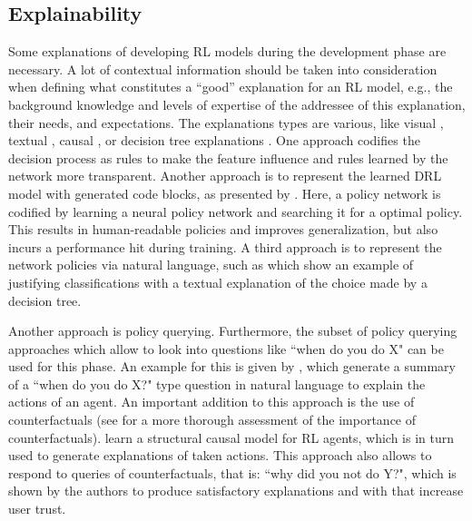 \documentclass[twoside,11pt]{article}
\begin{document}
\subsection{Explainability}
Some explanations of developing RL models during the development phase are necessary. A lot of contextual information should be taken into consideration when defining what constitutes a ``good” explanation for an RL model, e.g., the background knowledge and levels of expertise of the addressee of this explanation, their needs, and expectations. The explanations types are various, like visual \citep{DBLP:journals/corr/abs-1912-12191,DBLP:journals/corr/abs-1912-05743}, textual \citep{HayesShah:2017:AutonomousPolicyExplanation,fukuchi2017autonomous}, causal \citep{MadumalEtAl:2020:CausalRLCFs,Madumal:2020:DistalEF}, or decision tree explanations \citep{bastani2018verifiable}. One approach \citet{LiuEtAl:2018:LinearModelUTrees} codifies the decision process as rules to make the feature influence and rules learned by the network more transparent. Another approach is to represent the learned DRL model with generated code blocks, as presented by \citet{VermaEtAl:2018:ProgrammaticallyInterpretableRL}. Here, a policy network is codified by learning a neural policy network and searching it for a optimal policy. This results in human-readable policies and improves generalization, but also incurs a performance hit during training. A third approach is to represent the network policies via natural language, such as \citet{AlonsoEtAl:2018:xAINLBeerClassifier} which show an example of justifying classifications with a textual explanation of the choice made by a decision tree.

Another approach is policy querying.
Furthermore, the subset of policy querying approaches which allow to look into questions like ``when do you do X" can be used for this phase.
An example for this is given by \citet{HayesShah:2017:AutonomousPolicyExplanation}, which generate a summary of a ``when do you do X?" type question in natural language to explain the actions of an agent. An important addition to this approach is the use of counterfactuals (see \citet{EvansEtAl:2021:ExplainabilityParadox} for a more thorough assessment of the importance of counterfactuals). \citet{MadumalEtAl:2020:CausalRLCFs} learn a structural causal model for RL agents, which is in turn used to generate explanations of taken actions. This approach also allows to respond to queries of counterfactuals, that is: ``why did you not do Y?", which is shown by the authors to produce satisfactory explanations and with that increase user trust.
\end{document}
